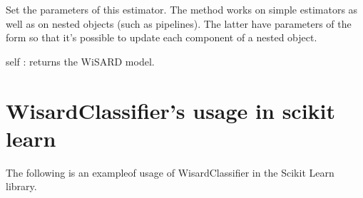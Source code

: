 \documentclass[letterpaper,10pt,english]{sphinxmanual}
\begin{document}
\begin{fulllineitems}
\begin{fulllineitems}
\begin{description}
\end{description}

\end{fulllineitems}


\begin{fulllineitems}
\label{\detokenize{index:wis.WisardClassifier.set_params}}
Set the parameters of this estimator.
The method works on simple estimators as well as on nested objects
(such as pipelines). The latter have parameters of the form
 so that it’s possible to update each
component of a nested object.

self : returns the WiSARD model.

\end{fulllineitems}


\end{fulllineitems}



\chapter{WisardClassifier’s usage in scikit learn}
\label{\detokenize{index:wisardclassifier-s-documentation}}\label{\detokenize{index:wisardclassifier-s-usage-in-scikit-learn}}
The following is an exampleof usage of WisardClassifier in the Scikit Learn
library.
\end{document}
